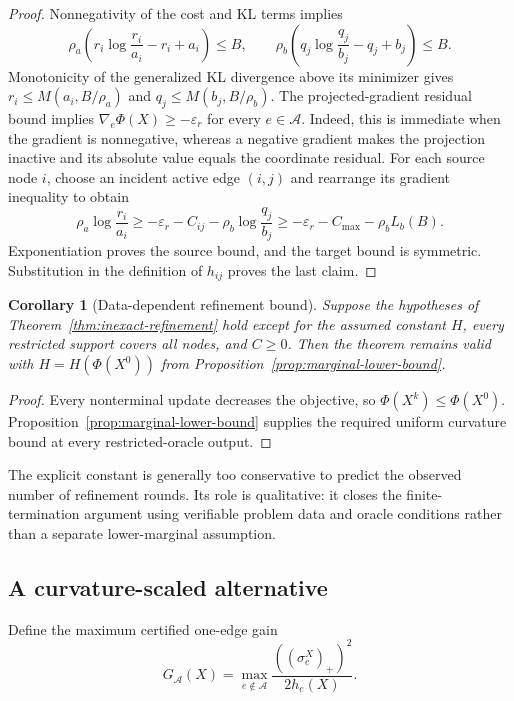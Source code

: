 \documentclass[11pt]{article}
\newtheorem{corollary}{Corollary}
\begin{document}
\begin{proof}
Nonnegativity of the cost and KL terms implies
$$\rho_a\left(r_i\log\frac{r_i}{a_i}-r_i+a_i\right)\leq B,\qquad \rho_b\left(q_j\log\frac{q_j}{b_j}-q_j+b_j\right)\leq B.$$
Monotonicity of the generalized KL divergence above its minimizer gives $r_i\leq M(a_i,B/\rho_a)$ and $q_j\leq M(b_j,B/\rho_b)$.
The projected-gradient residual bound implies $\nabla_e\Phi(X)\geq-\varepsilon_r$ for every $e\in\mathcal A$.
Indeed, this is immediate when the gradient is nonnegative, whereas a negative gradient makes the projection inactive and its absolute value equals the coordinate residual.
For each source node $i$, choose an incident active edge $(i,j)$ and rearrange its gradient inequality to obtain
$$\rho_a\log\frac{r_i}{a_i}\geq-\varepsilon_r-C_{ij}-\rho_b\log\frac{q_j}{b_j}\geq-\varepsilon_r-C_{\max}-\rho_bL_b(B).$$
Exponentiation proves the source bound, and the target bound is symmetric.
Substitution in the definition of $h_{ij}$ proves the last claim.
\end{proof}

\begin{corollary}[Data-dependent refinement bound]\label{cor:data-dependent-bound}
Suppose the hypotheses of Theorem~\ref{thm:inexact-refinement} hold except for the assumed constant $H$, every restricted support covers all nodes, and $C\geq0$.
Then the theorem remains valid with $H=H(\Phi(X^0))$ from Proposition~\ref{prop:marginal-lower-bound}.
\end{corollary}

\begin{proof}
Every nonterminal update decreases the objective, so $\Phi(X^k)\leq\Phi(X^0)$.
Proposition~\ref{prop:marginal-lower-bound} supplies the required uniform curvature bound at every restricted-oracle output.
\end{proof}

The explicit constant is generally too conservative to predict the observed number of refinement rounds.
Its role is qualitative: it closes the finite-termination argument using verifiable problem data and oracle conditions rather than a separate lower-marginal assumption.

\subsection{A curvature-scaled alternative}

Define the maximum certified one-edge gain
$$G_{\mathcal A}(X)=\max_{e\notin\mathcal A}\frac{((\sigma_e^X)_+)^2}{2h_e(X)}.$$
\end{document}
